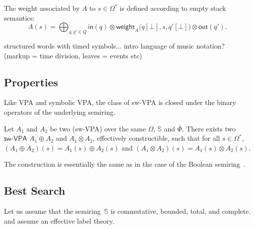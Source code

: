 \documentclass[runningheads]{llncs}
\newcommand{\config}[2]{\ensuremath{#1}[{#2}]}
\newcommand{\Semiring}{\mathbb{S}}
\def\SWVPA{\textsf{sw-VPA}\xspace}
\def\weight{\mathsf{weight}}
\newcommand{\call}[1]{\ensuremath #1} %
\newcommand{\return}[1]{\ensuremath #1} %
\def\Omegai{{\Omega_\mathsf{i}}}
\def\Omegac{{\Omega_\mathsf{c}}}
\def\Omegar{{\Omega_\mathsf{r}}}
\def\Phii{{\Phi_\mathsf{i}}}
\def\Phir{{\Phi_\mathsf{r}}}
\def\Phicr{{\Phi_\mathsf{cr}}}
\begin{document}
\noindent
The weight associated by $A$ to $s \in \Omega^*$
is defined according to empty stack semantics: 
%
\begin{equation}
A(s)  = 
{\displaystyle\bigoplus_{q, q' \in Q}} \textstyle
\mathsf{in}(q) \mathop{\otimes} 
\weight_A\bigl(\config{q}{\bot}, s, \config{q'}{\bot}\bigr) 
\mathop{\otimes} \mathsf{out}(q').
\label{eq:weightA}
\end{equation}

\begin{example}
structured words with timed symbols...
intro language of music notation? (markup = time division, leaves = events etc)
\end{example}


\subsection{Properties}
Like VPA and symbolic VPA, 
the class of \SWVPA is closed under the binary operators of the underlying semiring.
%
\begin{proposition}\label{prop:SWVPA-product}
Let $A_1$ and $A_2$ be two (\SWVPA)
over the same $\Omega$, $\Semiring$ and $\bar\Phi$.
There exists two $\SWVPA$ $A_1 \oplus A_2$ and $A_1 \otimes A_2$, 
effectively constructible, 
such that for all $s \in \Omega^*$, 
$(A_1 \oplus A_2)(s) = A_1(s) \oplus A_2(s)$ and 
$(A_1 \otimes A_2)(s) = A_1(s) \otimes A_2(s)$.
\end{proposition}
The construction is essentially the same 
as in the case of the Boolean semiring~\cite{dAntonyAlur14SVPDA}.


\subsection{Best Search} 
\label{sec:best}\label{sec:search}
Let us assume that the semiring~$\Semiring$ is
commutative, bounded, total, and complete.
and assume an effective label theory.

\end{document}
